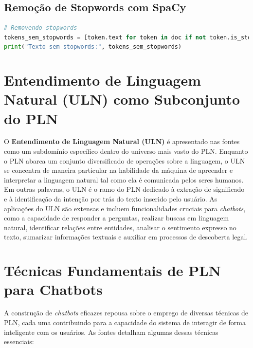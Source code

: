 \documentclass[14pt,a4paper,oneside]{book}
\begin{document}
\subsection{Remoção de Stopwords com SpaCy}
\begin{lstlisting}[language=Python]
# Removendo stopwords
tokens_sem_stopwords = [token.text for token in doc if not token.is_stop]
print("Texto sem stopwords:", tokens_sem_stopwords)
\end{lstlisting}
	

\section{Entendimento de Linguagem Natural (ULN) como Subconjunto do PLN}

O \textbf{Entendimento de Linguagem Natural (ULN)} é apresentado nas fontes como um subdomínio específico dentro do universo mais vasto do PLN. Enquanto o PLN abarca um conjunto diversificado de operações sobre a linguagem, o ULN se concentra de maneira particular na habilidade da máquina de apreender e interpretar a linguagem natural tal como ela é comunicada pelos seres humanos. 
Em outras palavras, o ULN é o ramo do PLN dedicado à extração de significado e à identificação da intenção por trás do texto inserido pelo usuário. As aplicações do ULN são extensas e incluem funcionalidades cruciais para \textit{chatbots}, como a capacidade de responder a perguntas, realizar buscas em linguagem natural, identificar relações entre entidades, analisar o sentimento expresso no texto, sumarizar informações textuais e auxiliar em processos de descoberta legal.


\section{Técnicas Fundamentais de PLN para Chatbots}

A construção de \textit{chatbots} eficazes repousa sobre o emprego de diversas técnicas de PLN, cada uma contribuindo para a capacidade do sistema de interagir de forma inteligente com os usuários. As fontes detalham algumas dessas técnicas essenciais:
\end{document}

